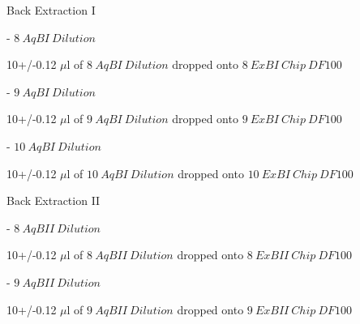 \documentclass[idxtotoc,hyperref,openany,oneside]{labbook} %
\newcommand{\cmark}{\ding{51}}%
\newcommand{\done}{\rlap{$\square$}{\raisebox{2pt}{\large\hspace{1pt}\cmark}}%
  \hspace{-2.5pt}}
\begin{document}
\begin{todolist}
\item[\done]{Back Extraction I}

  \begin{todolist}
  \item[\done]{- $\boxed{8\ AqBI\ Dilution}$}
  \end{todolist}
  \vspace{0.3cm}
  \begin{center}
    10+/-0.12 $\mu$l of $\boxed{8\ AqBI\ Dilution}$ dropped onto
    $\boxed{8\ ExBI\ Chip\ DF100}$
  \end{center}
  
  \begin{todolist}
  \item[\done]{- $\boxed{9\ AqBI\ Dilution}$}
  \end{todolist}
  \vspace{0.3cm}
  \begin{center}
    10+/-0.12 $\mu$l of $\boxed{9\ AqBI\ Dilution}$ dropped onto
    $\boxed{9\ ExBI\ Chip\ DF100}$
  \end{center}

  \begin{todolist}
  \item[\done]{- $\boxed{10\ AqBI\ Dilution}$}
  \end{todolist}
  \vspace{0.3cm}
  \begin{center}
    10+/-0.12 $\mu$l of $\boxed{10\ AqBI\ Dilution}$ dropped onto
    $\boxed{10\ ExBI\ Chip\ DF100}$
  \end{center}

\item[\done]{Back Extraction II}

  \begin{todolist}
  \item[\done]{- $\boxed{8\ AqBII\ Dilution}$}
  \end{todolist}
  \vspace{0.3cm}
  \begin{center}
    10+/-0.12 $\mu$l of $\boxed{8\ AqBII\ Dilution}$ dropped onto
    $\boxed{8\ ExBII\ Chip\ DF100}$
  \end{center}
  
  \begin{todolist}
  \item[\done]{- $\boxed{9\ AqBII\ Dilution}$}
  \end{todolist}
  \vspace{0.3cm}
  \begin{center}
    10+/-0.12 $\mu$l of $\boxed{9\ AqBII\ Dilution}$ dropped onto
    $\boxed{9\ ExBII\ Chip\ DF100}$
  \end{center}


\end{todolist}
\end{document}
